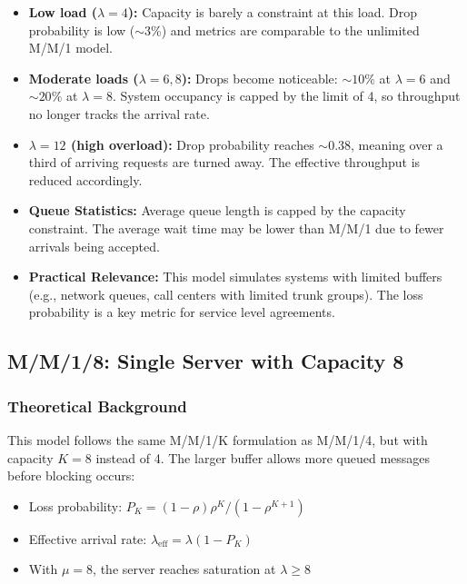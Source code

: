 \documentclass[12pt]{article}
\begin{document}
\begin{itemize}
    \item \textbf{Low load ($\lambda = 4$):} Capacity is barely a constraint at this load. Drop probability is low ($\sim 3$\%) and metrics are comparable to the unlimited M/M/1 model.

    \item \textbf{Moderate loads ($\lambda = 6, 8$):} Drops become noticeable: $\sim 10\%$ at $\lambda = 6$ and $\sim 20\%$ at $\lambda = 8$. System occupancy is capped by the limit of 4, so throughput no longer tracks the arrival rate.

    \item \textbf{$\lambda = 12$ (high overload):} Drop probability reaches $\sim 0.38$, meaning over a third of arriving requests are turned away. The effective throughput is reduced accordingly.

    \item \textbf{Queue Statistics:} Average queue length is capped by the capacity constraint. The average wait time may be lower than M/M/1 due to fewer arrivals being accepted.

    \item \textbf{Practical Relevance:} This model simulates systems with limited buffers (e.g., network queues, call centers with limited trunk groups). The loss probability is a key metric for service level agreements.
\end{itemize}

\subsection{M/M/1/8: Single Server with Capacity 8}

\subsubsection{Theoretical Background}

This model follows the same M/M/1/K formulation as M/M/1/4, but with capacity $K = 8$ instead of 4. The larger buffer allows more queued messages before blocking occurs:

\begin{itemize}
    \item Loss probability: $P_K = (1-\rho) \rho^K / (1 - \rho^{K+1})$
    \item Effective arrival rate: $\lambda_{\text{eff}} = \lambda(1 - P_K)$
    \item With $\mu = 8$, the server reaches saturation at $\lambda \ge 8$
\end{itemize}
\end{document}
